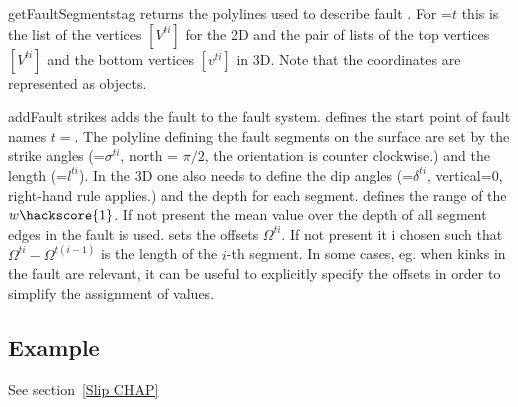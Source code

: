 \begin{methoddesc}[FaultSystem]{getFaultSegments}{tag}
returns the polylines used to describe fault . For =$t$ this is the list of the vertices
$[V^{ti}]$ for the 2D and the pair of lists of the top vertices $[V^{ti}]$ and the bottom vertices  $[v^{ti}]$ in 3D.
Note that the coordinates are represented as \numpyNDA objects.
\end{methoddesc}

\begin{methoddesc}[FaultSystem]{addFault}{
strikes}
adds the  fault  to the fault system. 
 defines the start point of fault names $t=$. The polyline
defining the fault segments on the surface are set 
by the strike angles  (=$\sigma^{ti}$, north = $\pi/2$, the orientation is counter clockwise.) and
the length  (=$l^{ti}$). In the 3D one also needs to define the 
dip angles  (=$\delta^{ti}$, vertical=$0$, right-hand rule applies.) and 
the depth  for each segment.
 defines the range of the $w\hackscore{1}$. If not present the mean value over the depth of 
all segment edges in the fault is used.
 sets the offsets $\Omega^{ti}$. If not present it i chosen such that $\Omega^{ti}-\Omega^{t(i-1)}$ is the length of the $i$-th segment. In some cases, eg. when kinks in the fault are relevant, it can be useful
to explicitly specify the offsets in order to simplify the assignment of values.
\end{methoddesc}

\subsection{Example}
See section~\ref{Slip CHAP}







